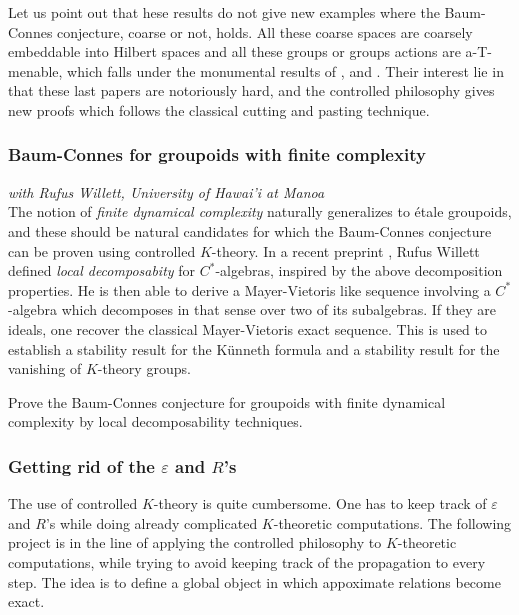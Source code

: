 Let us point out that hese results do not give new examples where the Baum-Connes conjecture, coarse or not, holds. All these coarse spaces are coarsely embeddable into Hilbert spaces and all these groups or groups actions are a-T-menable, which falls under the monumental results of \cite{HigsonKasparov}, \cite{TuThese} and \cite{Yu2}. Their interest lie in that these last papers are notoriously hard, and the controlled philosophy gives new proofs which follows the classical cutting and pasting technique.\\  

\subsubsection*{Baum-Connes for groupoids with finite complexity}
  
\textit{with Rufus Willett, University of Hawai'i at Manoa}\\

The notion of \textit{finite dynamical complexity} naturally generalizes to \'etale groupoids, and these should be natural candidates for which the Baum-Connes conjecture can be proven using controlled $K$-theory. In a recent preprint \cite{willett2019decompositions}, Rufus Willett defined \textit{local decomposabity} for $C^*$-algebras, inspired by the above decomposition properties. He is then able to derive a Mayer-Vietoris like sequence involving a $C^*$-algebra which decomposes in that sense over two of its subalgebras. If they are ideals, one recover the classical Mayer-Vietoris exact sequence. This is used to establish a stability result for the K\"unneth formula and a stability result for the vanishing of $K$-theory groups.\\

\begin{project}
Prove the Baum-Connes conjecture for groupoids with finite dynamical complexity by local decomposability techniques.  
\end{project} 

\subsubsection*{Getting rid of the $\varepsilon$ and $R$'s}

The use of controlled $K$-theory is quite cumbersome. One has to keep track of $\varepsilon $ and $R$'s while doing already complicated $K$-theoretic computations. The following project is in the line of applying the controlled philosophy to $K$-theoretic computations, while trying to avoid keeping track of the propagation to every step. The idea is to define a global object in which appoximate relations become exact. \\

